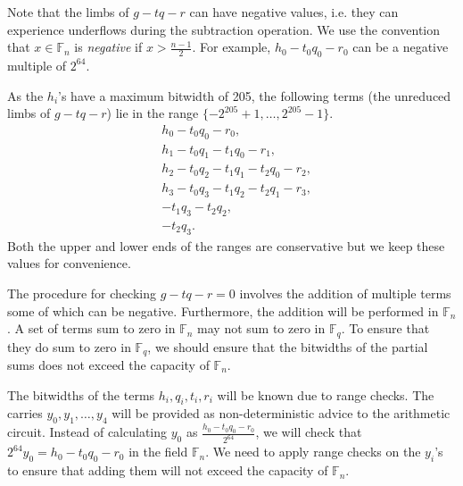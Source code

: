 \documentclass[a4paper, 12pt]{article}
\begin{document}
Note that the limbs of $g-tq-r$ can have negative values, i.e. they can experience underflows during the subtraction operation. We use the convention that $x \in \mathbb{F}_n$ is \textit{negative} if $x > \frac{n-1}{2}$.  For example, $h_0-t_0q_0-r_0$ can be a negative multiple of $2^{64}$.

As the $h_i$'s have a maximum bitwidth of 205, the following terms (the unreduced limbs of $g-tq-r$) lie in the range $\{-2^{205}+1,\ldots, 2^{205}-1\}$.
\begin{align*}
  & h_0 - t_0q_0-r_0,\\
  & h_1 - t_0q_1-t_1q_0-r_1,\\
  & h_2 - t_0q_2-t_1q_1-t_2q_0-r_2,\\
  & h_3 -  t_0q_3-t_1q_2-t_2q_1-r_3,\\
  & - t_1q_3-t_2q_2,\\
  & - t_2q_3.
\end{align*}
Both the upper and lower ends of the ranges are conservative but we keep these values for convenience.

The procedure for checking $g-tq-r =0$ involves the addition of multiple terms some of which can be negative. Furthermore, the addition will be performed in $\mathbb{F}_n$. A set of terms sum to zero in $\mathbb{F}_n$ may not sum to zero in $\mathbb{F}_q$. To ensure that they do sum to zero in $\mathbb{F}_q$, we should ensure that the bitwidths of the partial sums does not exceed the capacity of $\mathbb{F}_n$.

The bitwidths of the terms $h_i, q_i, t_i, r_i$ will be known due to range checks. The carries $y_0,y_1,\ldots,y_4$ will be provided as non-deterministic advice to the arithmetic circuit. Instead of calculating $y_0$ as $\frac{h_0-t_0q_0-r_0}{2^{64}}$, we will check that $2^{64}y_0 = h_0-t_0q_0-r_0$ in the field $\mathbb{F}_n$. We need to apply range checks on the $y_i$'s to ensure that adding them will not exceed the capacity of $\mathbb{F}_n$.
\end{document}
